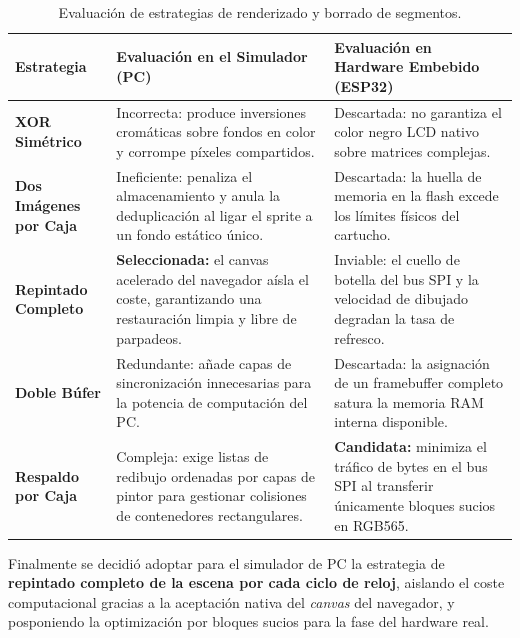 \begin{table}[h]
	\centering
	\small
	\begin{tabular}{lp{5.5cm}p{5.5cm}}
		\hline
		\textbf{Estrategia} & \textbf{Evaluación en el Simulador (PC)} & \textbf{Evaluación en Hardware Embebido (ESP32)} \\ \hline
		\textbf{XOR Simétrico} & Incorrecta: produce inversiones cromáticas sobre fondos en color y corrompe píxeles compartidos. & Descartada: no garantiza el color negro LCD nativo sobre matrices complejas. \\
		\textbf{Dos Imágenes por Caja} & Ineficiente: penaliza el almacenamiento y anula la deduplicación al ligar el sprite a un fondo estático único. & Descartada: la huella de memoria en la flash excede los límites físicos del cartucho. \\
		\textbf{Repintado Completo} & \textbf{Seleccionada:} el canvas acelerado del navegador aísla el coste, garantizando una restauración limpia y libre de parpadeos. & Inviable: el cuello de botella del bus SPI y la velocidad de dibujado degradan la tasa de refresco. \\
		\textbf{Doble Búfer} & Redundante: añade capas de sincronización innecesarias para la potencia de computación del PC. & Descartada: la asignación de un framebuffer completo satura la memoria RAM interna disponible. \\
		\textbf{Respaldo por Caja} & Compleja: exige listas de redibujo ordenadas por capas de pintor para gestionar colisiones de contenedores rectangulares. & \textbf{Candidata:} minimiza el tráfico de bytes en el bus SPI al transferir únicamente bloques sucios en RGB565. \\ \hline
	\end{tabular}
	\caption{Evaluación de estrategias de renderizado y borrado de segmentos.}
	\label{tab:estrategias_borrado}
\end{table}

Finalmente se decidió adoptar para el simulador de PC la estrategia de \textbf{repintado completo de la escena por cada ciclo de reloj}, aislando el coste computacional gracias a la aceptación nativa del \textit{canvas} del navegador, y posponiendo la optimización por bloques sucios para la fase del hardware real.

\clearpage

